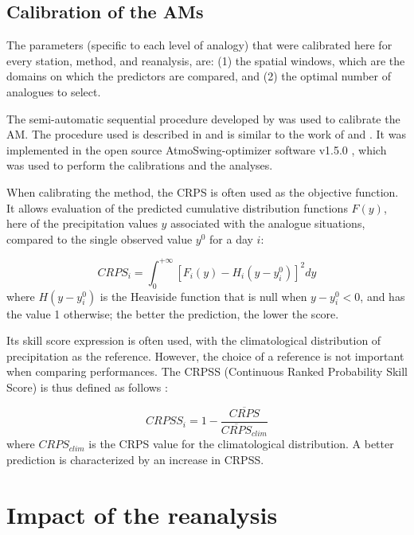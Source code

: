 \documentclass{ametsoc}
\begin{document}
	
	\subsection{Calibration of the AMs}
	\label{sec:calibration}
	
	The parameters (specific to each level of analogy) that were calibrated here for every station, method, and reanalysis, are: (1) the spatial windows, which are the domains on which the predictors are compared, and (2) the optimal number of analogues to select.
	
	The semi-automatic sequential procedure developed by \citet{Bontron2004} was used to calibrate the AM. The procedure used is described in \citet{Horton2017c} and is similar to the work of \citet{Radanovics2013} and \citet{BenDaoud2016}. It was implemented in the open source AtmoSwing-optimizer software v1.5.0 \citep[www.atmoswing.org,][]{Horton2017a}, which was used to perform the calibrations and the analyses.
	
	When calibrating the method, the CRPS \citep[Continuous Ranked Probability Score,][]{Brown1974, Matheson1976, Hersbach2000} is often used as the objective function. It allows evaluation of the predicted cumulative distribution functions $F(y)$, here of the precipitation values $y$ associated with the analogue situations, compared to the single observed value $y^{0}$ for a day $i$:
	
	\begin{equation}
	\label{eq:CRPS}
	CRPS_{i} = \int_{0}^{+\infty} \left[ F_{i}(y)-H_{i}(y-y_{i}^{0})\right]^{2} dy
	\end{equation}
	where $H(y-y_{i}^{0})$ is the Heaviside function that is null when $y-y_{i}^{0}<0$, and has the value 1 otherwise; the better the prediction, the lower the score.
	
	Its skill score expression is often used, with the climatological distribution of precipitation as the reference. However, the choice of a reference is not important when comparing performances. The CRPSS (Continuous Ranked Probability Skill Score) is thus defined as follows \citep{Bradley2011}:
	
	\begin{equation}
	\label{eq:CRPSS}
	CRPSS_{i} = 1-\frac{\overline{CRPS}}{\overline{CRPS}_{clim}}
	\end{equation}
	where $CRPS_{clim}$ is the CRPS value for the climatological distribution. A better prediction is characterized by an increase in CRPSS.
	
	
	\section{Impact of the reanalysis}
	\label{sec:influence}
	
\end{document}
